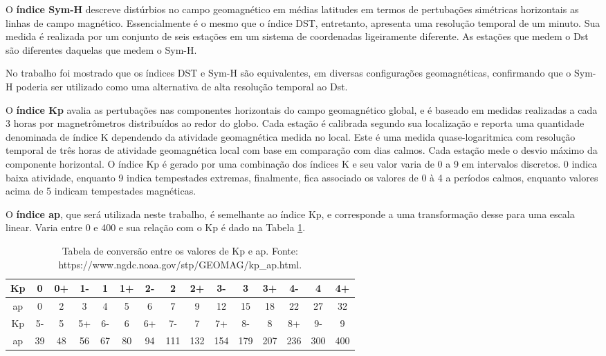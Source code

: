 O {\bf índice Sym-H} descreve distúrbios no campo geomagnético em médias latitudes em termos de pertubações simétricas horizontais as linhas de campo magnético. Essencialmente é o mesmo que o índice DST, entretanto, apresenta uma resolução temporal de um minuto. Sua medida é realizada por um conjunto de seis estações em um sistema de coordenadas ligeiramente diferente. As estações que medem o Dst são diferentes daquelas que medem o Sym-H.

No trabalho \cite{WANLISS:2006} foi mostrado que os índices DST e Sym-H são equivalentes, em diversas configurações geomagnéticas, confirmando que o Sym-H poderia ser utilizado como uma alternativa de alta resolução temporal ao Dst.

O {\bf índice Kp} avalia as pertubações nas componentes horizontais do campo geomagnético global, e é baseado em medidas realizadas a cada 3 horas por magnetrômetros distribuídos ao redor do globo. Cada estação é calibrada segundo sua localização e reporta uma quantidade denominada de índice K dependendo da atividade geomagnética medida no local. Este é uma medida quase-logaritmica com resolução temporal de três horas de atividade geomagnética local com base em comparação com dias calmos. Cada estação mede o desvio máximo da componente horizontal. O índice Kp é gerado por uma combinação dos índices K e seu valor varia de 0 a 9 em intervalos discretos. 0 indica baixa atividade, enquanto 9 indica tempestades extremas, finalmente, fica associado os valores de 0 à 4 a períodos calmos, enquanto valores acima de 5 indicam tempestades magnéticas.

O {\bf índice ap}, que será utilizada neste trabalho, é semelhante ao índice Kp, e corresponde a uma transformação desse para uma escala linear. Varia entre 0 e 400 e sua relação com o Kp é dado na Tabela \ref{tab:kptoap}.

\begin{table}[hhh]
\begin{tabular}{|c|c|c|c|c|c|c|c|c|c|c|c|c|c|c|} \hline
Kp & 0  & 0+ & 1- & 1  & 1+ & 2- & 2   & 2+  & 3-  & 3   & 3+  & 4-  & 4   & 4+  \\ \hline
ap & 0  & 2  & 3  & 4  & 5  & 6  & 7   & 9   & 12  & 15  & 18  & 22  & 27  & 32  \\ \hline
Kp & 5- & 5  & 5+ & 6- & 6  & 6+ & 7-  & 7   & 7+  & 8-  & 8   & 8+  & 9-  & 9   \\ \hline
ap & 39 & 48 & 56 & 67 & 80 & 94 & 111 & 132 & 154 & 179 & 207 & 236 & 300 & 400 \\ \hline
\end{tabular}
\caption{Tabela de conversão entre os valores de Kp e ap. Fonte: https://www.ngdc.noaa.gov/stp/GEOMAG/kp\_ap.html.}
\label{tab:kptoap}
\end{table}

